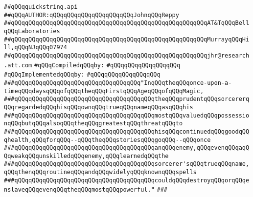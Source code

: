 \label{src/lib/src/quickstring.api}
\verb|##qQQqquickstring.api|\newline
\verb|##qQQqAUTHOR:qQQqqQQqqQQqqQQqqQQqqQQqJohnqQQqReppy|\newline
\verb|##qQQqqQQqqQQqqQQqqQQqqQQqqQQqqQQqqQQqqQQqqQQqqQQqqQQqqQQqAT&TqQQqBellqQQqLaboratories|\newline
\verb|##qQQqqQQqqQQqqQQqqQQqqQQqqQQqqQQqqQQqqQQqqQQqqQQqqQQqqQQqMurrayqQQqHill,qQQqNJqQQq07974|\newline
\verb|##qQQqqQQqqQQqqQQqqQQqqQQqqQQqqQQqqQQqqQQqqQQqqQQqqQQqqQQqjhr@research.att.com|\newline
\newline
\verb|#qQQqCompiledqQQqby:|\newline
\verb|#qQQqqQQqqQQqqQQqqQQq|\newline
\newline
\verb|#qQQqImplementedqQQqby:|\newline
\verb|#qQQqqQQqqQQqqQQqqQQq|\newline
\newline
\newline
\verb|###qQQqqQQqqQQqqQQqqQQqqQQqqQQqqQQqqQQq"InqQQqtheqQQqonce-upon-a-timeqQQqdaysqQQqofqQQqtheqQQqFirstqQQqAgeqQQqofqQQqMagic,|\newline
\verb|###qQQqqQQqqQQqqQQqqQQqqQQqqQQqqQQqqQQqqQQqtheqQQqprudentqQQqsorcererqQQqregardedqQQqhisqQQqownqQQqtrueqQQqnameqQQqasqQQqhis|\newline
\verb|###qQQqqQQqqQQqqQQqqQQqqQQqqQQqqQQqqQQqqQQqmostqQQqvaluedqQQqpossessionqQQqbutqQQqalsoqQQqtheqQQqgreatestqQQqthreatqQQqto|\newline
\verb|###qQQqqQQqqQQqqQQqqQQqqQQqqQQqqQQqqQQqqQQqhisqQQqcontinuedqQQqgoodqQQqhealth,qQQqforqQQq--qQQqtheqQQqstoriesqQQqgoqQQq--qQQqonce|\newline
\verb|###qQQqqQQqqQQqqQQqqQQqqQQqqQQqqQQqqQQqqQQqanqQQqenemy,qQQqevenqQQqaqQQqweakqQQqunskilledqQQqenemy,qQQqlearnedqQQqthe|\newline
\verb|###qQQqqQQqqQQqqQQqqQQqqQQqqQQqqQQqqQQqqQQqsorcerer'sqQQqtrueqQQqname,qQQqthenqQQqroutineqQQqandqQQqwidelyqQQqknownqQQqspells|\newline
\verb|###qQQqqQQqqQQqqQQqqQQqqQQqqQQqqQQqqQQqqQQqcouldqQQqdestroyqQQqorqQQqenslaveqQQqevenqQQqtheqQQqmostqQQqpowerful."|\newline
\verb|###|\newline
